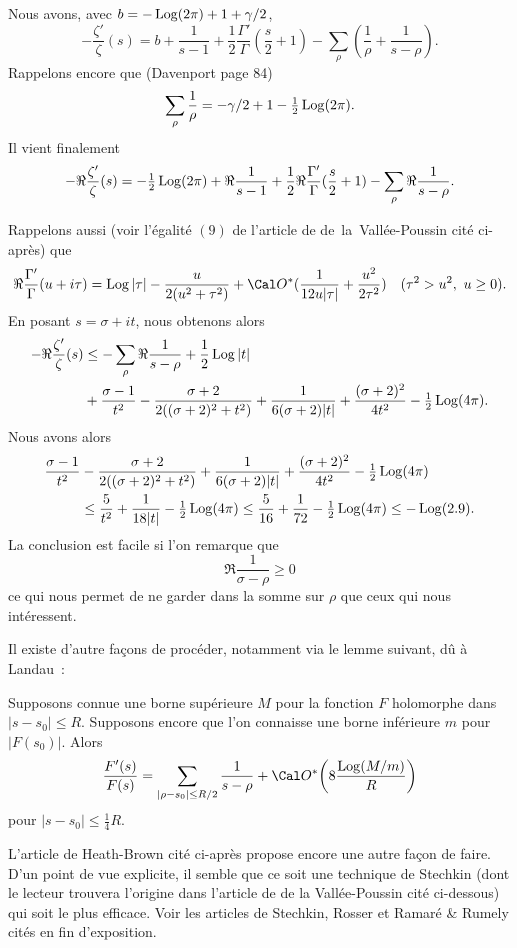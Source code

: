 
Nous avons, avec $b=-\Log(2\pi)+1+\gamma/2$, 
$$
-\frac{\zeta'}{\zeta}(s)=b+\frac{1}{s-1}+\frac12\frac{\Gamma'}{\Gamma}
(\frac s2+1)-\sum_{\rho}\left(\frac{1}{\rho}+\frac{1}{s-\rho}\right).
$$
Rappelons encore que (Davenport page 84)
$$
\sum_{\rho}\frac1\rho=-\gamma/2+1-\tfrac12\Log(2\pi).
$$
Il vient finalement
$$
-\Re\frac{\zeta'}{\zeta}(s)=-\tfrac12\Log(2\pi)+\Re\frac{1}{s-1}
+\frac12\Re\frac{\Gamma'}{\Gamma}
(\frac s2+1)-\sum_{\rho}\Re\frac{1}{s-\rho}.
$$

Rappelons aussi (voir l'\'egalit\'e $(9)$ de l'article de
de~la~Vall\'ee-Poussin cit\'e ci-apr\`es) que
$$
\Re\frac{\Gamma'}{\Gamma}(u+i\tau)=\Log|\tau|-\frac{u}{2(u^2+\tau^2)}
+\Cal O^*(\frac1{12 u|\tau|}+\frac{u^2}{2\tau^2})
\quad(\tau^2>u^2,\ u\ge0).
$$
En posant $s=\sigma+it$, nous obtenons alors
$$
\aligned
-\Re\frac{\zeta'}{\zeta}(s)
&\le
-\sum_{\rho}\Re\frac{1}{s-\rho}
+\frac12\Log|t|
\\&
+\frac{\sigma-1}{t^2}
-\frac{\sigma+2}{2((\sigma+2)^2+t^2)}
+\frac1{6 (\sigma+2)|t|}+\frac{(\sigma+2)^2}{4t^2}
-\tfrac12\Log(4\pi).
\endaligned
$$
Nous avons alors
$$
\aligned
\frac{\sigma-1}{t^2}
&-\frac{\sigma+2}{2((\sigma+2)^2+t^2)}
+\frac1{6 (\sigma+2)|t|}+\frac{(\sigma+2)^2}{4t^2}
-\tfrac12\Log(4\pi)
\\&\le\frac{5}{t^2}+\frac{1}{18|t|}-\tfrac12\Log(4\pi)
\le\frac{5}{16}+\frac{1}{72}-\tfrac12\Log(4\pi)\le
-\Log(2.9).
\endaligned
$$
La conclusion est facile si l'on remarque que
$$
\Re\frac{1}{\sigma-\rho}\ge0
$$
ce qui nous permet de ne garder dans la somme sur $\rho$ que ceux qui
nous int\'eressent.
\fin



\bigskip
Il existe d'autre fa\c cons de proc\'eder, notamment via le lemme
suivant, d\^u \`a Landau~:

Supposons connue une borne sup\'erieure $M$ pour la fonction $F$
holomorphe dans $|s-s_0|\le R$. Supposons encore que l'on connaisse
une borne inf\'erieure $m$ pour $|F(s_0)|$. Alors
$$
\frac{F'(s)}{F(s)}=\sum_{|\rho-s_0|\le R/2}\frac1{s-\rho}+\Cal O^*\bigg(
8\frac{\Log(M/m)}{R}\bigg)
$$
pour $|s-s_0|\le\tfrac14 R$.
\endproclaim\goodbreak

L'article de Heath-Brown cit\'e ci-apr\`es propose encore une autre
fa\c con de faire. D'un point de vue explicite, il semble que ce soit
une technique de Stechkin (dont le lecteur trouvera l'origine dans
l'article de de la Vall\'ee-Poussin cit\'e ci-dessous)
qui soit le plus efficace. Voir les articles de Stechkin, Rosser et
Ramar\'e \& Rumely cit\'es en fin d'exposition.

